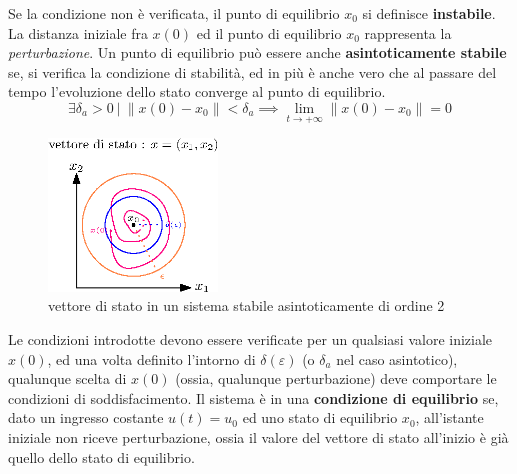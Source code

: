 \documentclass[10pt, letterpaper]{report}
\begin{document}
Se la condizione non è verificata, il punto di equilibrio $x_0$ si definisce \textbf{instabile}. La distanza 
iniziale fra $x(0)$ ed il punto di equilibrio $x_0$ rappresenta la \textit{perturbazione}.\acc 
Un punto di equilibrio può essere anche \textbf{asintoticamente stabile} se, si verifica la condizione di 
stabilità, ed in più è anche vero che al passare del tempo l'evoluzione dello stato converge al punto di 
equilibrio. 
$$ \exists \delta_a>0 \ | \   \left\lVert x(0)-x_0 \right\rVert<\delta_a\implies 
\lim_{t\rightarrow +\infty} \left\lVert x(0)-x_0 \right\rVert=0$$
\begin{center}
    \begin{figure}[h!]
        \centering
        \includegraphics[width=0.4\textwidth ]{images/stabilita2.eps}
        \caption{vettore di stato in un sistema stabile asintoticamente di ordine 2}
   \end{figure}
   \end{center}
Le condizioni introdotte devono essere verificate per un qualsiasi valore iniziale $x(0)$, ed una 
volta definito l'intorno di $\delta(\varepsilon)$ (o $\delta_a$ nel caso asintotico), qualunque scelta 
di $x(0)$ (ossia, qualunque perturbazione) deve comportare le condizioni di soddisfacimento.
Il sistema è in una  \textbf{condizione di equilibrio} se, dato un ingresso costante 
$u(t)=u_0$ ed uno stato di equilibrio $x_0$, all'istante iniziale non riceve perturbazione, ossia 
il valore del vettore di stato all'inizio è già quello dello stato di equilibrio. 
 
\end{document}
